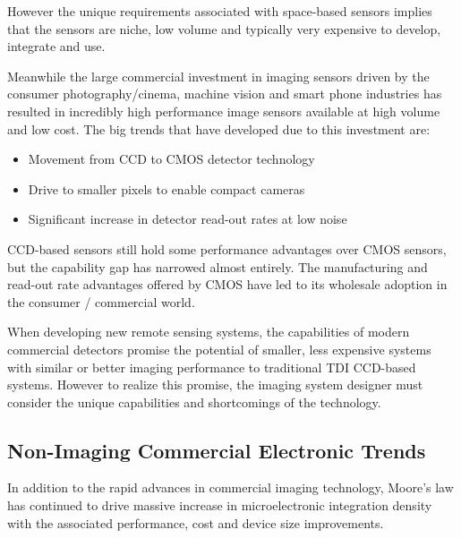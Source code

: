 \documentclass[10pt,journal]{IEEEtran}  %
\begin{document}
However the unique requirements associated with space-based sensors implies that the sensors are niche, low volume and typically very expensive to develop, integrate and use.

Meanwhile the large commercial investment in imaging sensors driven by the consumer photography/cinema, machine vision and smart phone industries has resulted in incredibly high performance image sensors available at high volume and low cost.  The big trends that have developed due to this investment are:

\begin{itemize}
    \item Movement from CCD to CMOS detector technology
    \item Drive to smaller pixels to enable compact cameras \cite{isscc2016}
    \item Significant increase in detector read-out rates at low noise
\end{itemize}


CCD-based sensors still hold some performance advantages over CMOS sensors, but the capability gap has narrowed almost entirely. The manufacturing and read-out rate advantages offered by CMOS have led to its wholesale adoption in the consumer / commercial world.

When developing new remote sensing systems, the capabilities of modern commercial detectors promise the potential of smaller, less expensive systems with similar or better imaging performance to traditional TDI CCD-based systems.  However to realize this promise, the imaging system designer must consider the unique capabilities and shortcomings of the technology.

\subsection{Non-Imaging Commercial Electronic Trends}

In addition to the rapid advances in commercial imaging technology, Moore's law has continued to drive massive increase in microelectronic integration density with the associated performance, cost and device size improvements.
\end{document}
